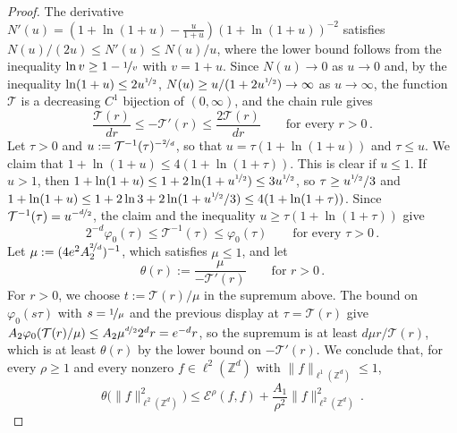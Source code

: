 \documentclass[11pt]{amsart}
\numberwithin{equation}{section}
\newcommand{\Z}{\mathbb{Z}}
\newcommand{\nf}{\nicefrac}
\begin{document}
\begin{proof}
The derivative $N'(u) = (1 + \ln(1 + u) - \frac{u}{1 + u}) (1 + \ln(1 + u))^{-2}$ satisfies $N(u)/(2u) \leq N'(u) \leq N(u)/u$, where the lower bound follows from the inequality $\ln v \geq 1 - \nf{1}{v}$ with $v = 1 + u$.
Since $N(u) \to 0$ as $u \to 0$ and, by the inequality $\ln(1 + u) \leq 2 u^{\nf12}$, $N(u) \geq u / (1 + 2 u^{\nf12}) \to \infty$ as $u \to \infty$, the function $\mathcal{T}$ is a decreasing $C^1$ bijection of $(0, \infty)$, and the chain rule gives
\begin{equation*}
    \frac{\mathcal{T}(r)}{d r} \leq - \mathcal{T}'(r) \leq \frac{2 \mathcal{T}(r)}{d r} \qquad \text{for every } r > 0\,.
\end{equation*}
Let $\tau > 0$ and $u := \mathcal{T}^{-1}(\tau)^{-\nf{2}{d}}$, so that $u = \tau (1 + \ln(1 + u))$ and $\tau \leq u$.
We claim that $1 + \ln(1 + u) \leq 4 (1 + \ln(1 + \tau))$.
This is clear if $u \leq 1$.
If $u > 1$, then $1 + \ln(1 + u) \leq 1 + 2 \ln(1 + u^{\nf12}) \leq 3 u^{\nf12}$, so $\tau \geq u^{\nf12}/3$ and $1 + \ln(1 + u) \leq 1 + 2 \ln 3 + 2 \ln(1 + u^{\nf12}/3) \leq 4 (1 + \ln(1 + \tau))$.
Since $\mathcal{T}^{-1}(\tau) = u^{-\nf{d}{2}}$, the claim and the inequality $u \geq \tau (1 + \ln(1 + \tau))$ give
\begin{equation*}
    2^{-d} \varphi_0(\tau) \leq \mathcal{T}^{-1}(\tau) \leq \varphi_0(\tau) \qquad \text{for every } \tau > 0\,.
\end{equation*}
Let $\mu := (4 e^2 A_2^{\nf{2}{d}})^{-1}$, which satisfies $\mu \leq 1$, and let
\begin{equation*}
    \theta(r) := \frac{\mu}{- \mathcal{T}'(r)} \qquad \text{for } r > 0\,.
\end{equation*}
For $r > 0$, we choose $t := \mathcal{T}(r)/\mu$ in the supremum above.
The bound on $\varphi_0(s \tau)$ with $s = \nf{1}{\mu}$ and the previous display at $\tau = \mathcal{T}(r)$ give $A_2 \varphi_0(\mathcal{T}(r)/\mu) \leq A_2 \mu^{\nf{d}{2}} 2^d r = e^{-d} r$, so the supremum is at least $d \mu r / \mathcal{T}(r)$, which is at least $\theta(r)$ by the lower bound on $-\mathcal{T}'(r)$.
We conclude that, for every $\rho \geq 1$ and every nonzero $f \in \ell^2(\Z^d)$ with $\|f\|_{\ell^1(\Z^d)} \leq 1$,
\begin{equation*}
    \theta \bigl( \|f\|_{\ell^2(\Z^d)}^2 \bigr) \leq \mathcal{E}^\rho(f, f) + \frac{A_1}{\rho^2} \|f\|_{\ell^2(\Z^d)}^2\,.
\end{equation*}


\end{proof}
\end{document}
